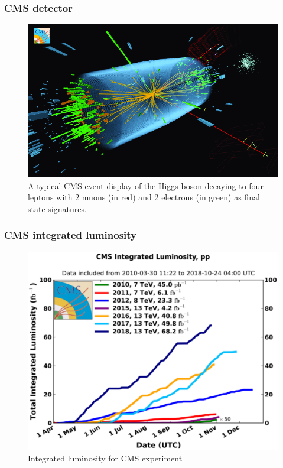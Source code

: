 \documentclass[11pt]{beamer}
\begin{document}
\begin{frame}
\frametitle{CMS detector}
\begin{figure}
	\centering
	\includegraphics[scale=0.4]{figures/pp.png}
	\caption*{\small A typical CMS event display of the Higgs boson decaying to four leptons with 2 muons (in red) and 2 electrons (in green) as final state signatures.}
\end{figure}
\end{frame}

\begin{frame}
\frametitle{CMS integrated luminosity}
\begin{center}
	\begin{figure}
		\includegraphics[scale=0.3]{figures/cms_lumi.png}
		\caption*{Integrated luminosity for CMS experiment }
	\end{figure}
\end{center}
\end{frame}
\end{document}
